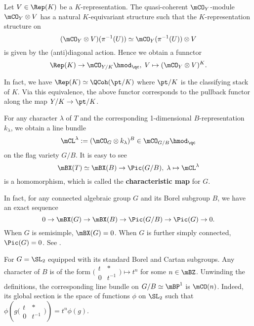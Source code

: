 	

	

	\begin{constr}
		Let $V\in \Rep(K)$ be a $K$-representation. The quasi-coherent $\mCO_Y$-module $\mCO_Y \ot V$ has a natural $K$-equivariant structure such that the $K$-representation structure on
		\[
			(\mCO_Y \ot V)(\pi^{-1}(U))  \simeq \mCO_Y(\pi^{-1}(U)) \ot V
		\]
		is given by the (anti)diagonal action. Hence we obtain a funnctor
		\[
			\Rep(K) \to \mCO_{Y/K} \hmod_\qc,\; V\mapsto (\mCO_Y \ot V)^K.
		\]
	\end{constr}

	\begin{rem}
		In fact, we have $\Rep(K)\simeq \QCoh(\pt/K)$ where $\pt/K$ is the classifying stack of $K$. Via this equivalence, the above functor corresponds to the pullback functor along the map $Y/K \to \pt/K$.
	\end{rem}

	\begin{constr}
		For any character $\lambda$ of $T$ and the corresponding 1-dimensional $B$-representation $k_\lambda$, we obtain a line bundle
		\[
			\mCL^\lambda:= (\mCO_G\ot k_\lambda)^B \in \mCO_{G/B}\hmod_\qc
		\]
		on the flag variety $G/B$. It is easy to see
		\begin{equation}
			\label{eqn-character-to-line-bundle}
			\mBX(T)\simeq \mBX(B) \to \Pic(G/B),\; \lambda \mapsto \mCL^\lambda
		\end{equation}
		is a homomorphism, which is called the \textbf{characteristic map} for $G$.
	\end{constr}

	\begin{rem}
		In fact, for any connected algebraic group $G$ and its Borel subgroup $B$, we have an exact sequence
		\[
			0 \to \mBX(G) \to \mBX(B) \to  \Pic(G/B) \to \Pic(G) \to 0.
		\]
		When $G$ is semisimple, $\mBX(G)=0$. When $G$ is further simply connected, $\Pic(G) = 0$. See \cite[Section 18]{M}.

	\end{rem}

	

	\begin{exam}
		For $G=\SL_2$ equipped with its standard Borel and Cartan subgroups. Any character of $B$ is of the form $\big(\begin{smallmatrix} t & *\\ 0 & t^{-1} \end{smallmatrix}\big)\mapsto t^n$ for some $n\in \mBZ$. Unwinding the definitions, the corresponding line bundle on $G/B\simeq \mBP^1$ is $\mCO(n)$. Indeed, its global section is the space of functions $\phi$ on $\SL_2$ such that $\phi(g\big(\begin{smallmatrix} t & *\\ 0 & t^{-1} \end{smallmatrix}\big))=t^n\phi(g)$.
	\end{exam}

